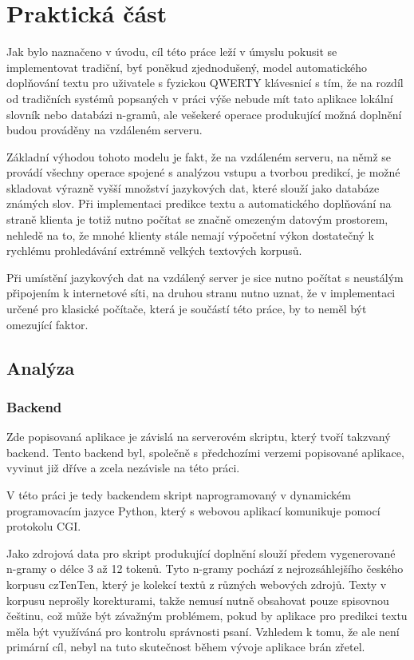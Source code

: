 \documentclass{article}
\begin{document}
\section{Praktická část}

Jak bylo naznačeno v úvodu, cíl této práce leží v úmyslu pokusit se implementovat tradiční, byť poněkud zjednodušený, model automatického doplňování textu pro uživatele s fyzickou QWERTY klávesnicí s tím, že na rozdíl od tradičních systémů popsaných v práci výše nebude mít tato aplikace lokální slovník nebo databázi n-gramů, ale vešekeré operace produkující možná doplnění budou prováděny na vzdáleném serveru.

Základní výhodou tohoto modelu je fakt, že na vzdáleném serveru, na němž se provádí všechny operace spojené s analýzou vstupu a tvorbou predikcí, je možné skladovat výrazně vyšší množství jazykových dat, které slouží jako databáze známých slov. Při implementaci predikce textu a automatického doplňování na straně klienta je totiž nutno počítat se značně omezeným datovým prostorem, nehledě na to, že mnohé klienty stále nemají výpočetní výkon dostatečný k rychlému prohledávání extrémně velkých textových korpusů.

Při umístění jazykových dat na vzdálený server je sice nutno počítat s neustálým připojením k internetové síti, na druhou stranu nutno uznat, že v implementaci určené pro klasické počítače, která je součástí této práce, by to neměl být omezující faktor. 

\subsection{Analýza}

\subsubsection{Backend}

Zde popisovaná aplikace je závislá na serverovém skriptu, který tvoří takzvaný backend. Tento backend byl, společně s předchozími verzemi popisované aplikace, vyvinut již dříve a zcela nezávisle na této práci. 

V této práci je tedy backendem skript naprogramovaný v dynamickém programovacím jazyce Python, který s webovou aplikací komunikuje pomocí protokolu CGI. 


Jako zdrojová data pro skript produkující doplnění slouží předem vygenerované n-gramy o délce 3 až 12 tokenů. Tyto n-gramy pochází z nejrozsáhlejšího českého korpusu czTenTen, který je kolekcí textů z různých webových zdrojů. Texty v korpusu neprošly korekturami, takže nemusí nutně obsahovat pouze spisovnou češtinu, což může být závažným problémem, pokud by aplikace pro predikci textu měla být využíváná pro kontrolu správnosti psaní. Vzhledem k tomu, že ale není primární cíl, nebyl na tuto skutečnost během vývoje aplikace brán zřetel. 
\end{document}
